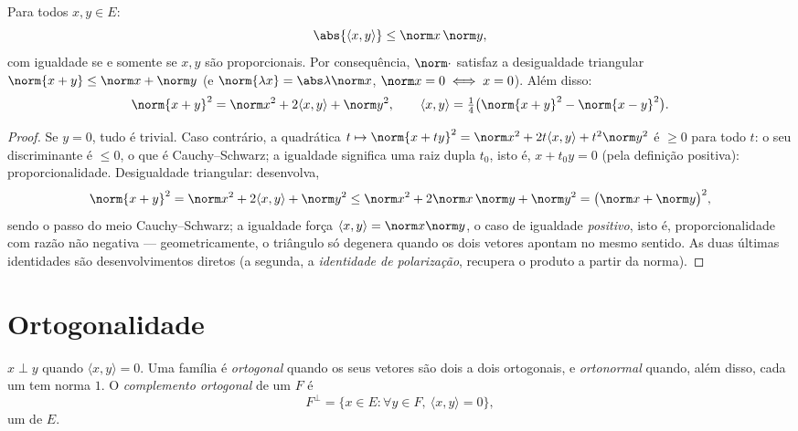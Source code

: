 \begin{theorem}\label{thm:b1:euclid:cs}
Para todos $x, y \in E$:
\[
\abs{\langle x, y\rangle} \leq \norm x\, \norm y ,
\]
com igualdade se e somente se $x, y$ são proporcionais. Por
consequência, $\norm\cdot$ satisfaz a desigualdade triangular $\norm{x + y} \leq \norm x + \norm
y$ (e
$\norm{\lambda x} = \abs\lambda \norm x$, $\norm x = 0 \iff
x = 0$). Além disso:
\[
\norm{x+y}^2 = \norm x^2 + 2\langle x, y\rangle + \norm y^2,
\qquad
\langle x, y \rangle = \tfrac14\bigl(\norm{x+y}^2 -
\norm{x-y}^2\bigr) .
\]
\end{theorem}

\begin{proof}
Se $y = 0$, tudo é trivial. Caso contrário, a quadrática $t
\mapsto \norm{x + ty}^2 = \norm x^2 + 2t\langle x, y\rangle + t^2
\norm y^2$ é
$\geq 0$ para todo $t$: o seu discriminante é $\leq 0$, o que é
Cauchy--Schwarz; a igualdade significa uma raiz dupla $t_0$, isto é,
$x + t_0 y = 0$ (pela definição positiva): proporcionalidade. Desigualdade
triangular: desenvolva,
\[
\norm{x + y}^2 = \norm x^2 + 2\langle x, y\rangle + \norm y^2
\leq \norm x^2 + 2\norm x\,\norm y + \norm y^2
= \bigl(\norm x + \norm y\bigr)^2 ,
\]
sendo o passo do meio Cauchy--Schwarz; a igualdade força $\langle
x, y\rangle = \norm x\norm y$, o
caso de igualdade \emph{positivo}, isto é, proporcionalidade com
razão não negativa --- geometricamente, o triângulo só degenera
quando os dois vetores apontam no mesmo sentido. As duas últimas
identidades são desenvolvimentos diretos (a segunda, a
\emph{identidade de polarização}, recupera o produto a partir da
norma).
\end{proof}

\section{Ortogonalidade}

\begin{definition}\label{def:b1:euclid:orthogonal}
$x \perp y$ quando $\langle x, y \rangle = 0$. Uma família é \emph{ortogonal} quando os seus
vetores são dois a dois ortogonais, e
\emph{ortonormal} quando, além disso, cada
um tem norma $1$. O \emph{complemento ortogonal} de um  $F$
é
\[
F^{\perp} = \{x \in E : \forall y \in F,\ \langle x, y\rangle =
0\},
\]
um  de $E$.
\end{definition}

